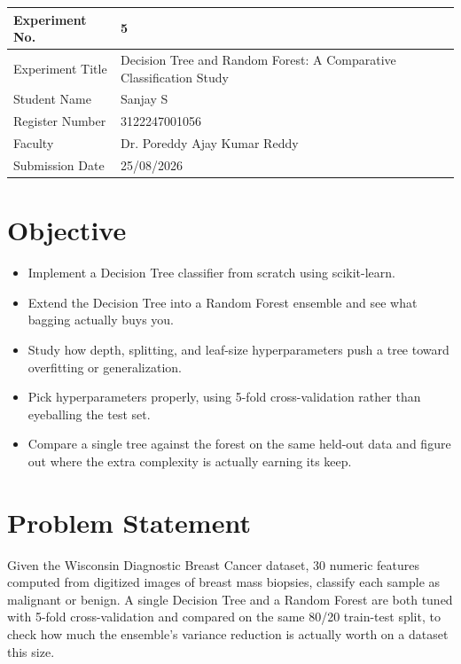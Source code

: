 \documentclass[12pt,a4paper]{article}
\begin{document}
\begin{tabular}{|p{4cm}|p{11cm}|}
\hline
Experiment No. & 5 \\ \hline
Experiment Title & Decision Tree and Random Forest: A Comparative Classification Study\footnotemark \\ \hline
Student Name & Sanjay S \\ \hline
Register Number & 3122247001056 \\ \hline
Faculty & Dr. Poreddy Ajay Kumar Reddy \\ \hline
Submission Date & 25/08/2026 \\ \hline
\end{tabular}

\section{Objective}
\begin{itemize}
\item Implement a Decision Tree classifier from scratch using scikit-learn.
\item Extend the Decision Tree into a Random Forest ensemble and see what bagging actually buys you.
\item Study how depth, splitting, and leaf-size hyperparameters push a tree toward overfitting or
generalization.
\item Pick hyperparameters properly, using 5-fold cross-validation rather than eyeballing the test set.
\item Compare a single tree against the forest on the same held-out data and figure out where the
extra complexity is actually earning its keep.
\end{itemize}

\section{Problem Statement}
Given the Wisconsin Diagnostic Breast Cancer dataset, 30 numeric features computed from digitized
images of breast mass biopsies, classify each sample as malignant or benign. A single Decision Tree
and a Random Forest are both tuned with 5-fold cross-validation and compared on the same 80/20
train-test split, to check how much the ensemble's variance reduction is actually worth on a dataset
this size.
\end{document}
